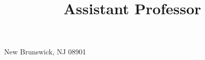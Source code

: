 



\usepackage{url,fancyhdr}

\usepackage{fontspec}
\usepackage{xunicode}
\usepackage{xcolor}

\let\sups\relax
\usepackage{tipa}
\usepackage{multicol}
\usepackage[spanish, english]{babel}
\usepackage{natbib}
\usepackage{bibentry}
\newcommand{\bibverse}[1]{\begin{verse} \bibentry{#1}. \end{verse}}
\usepackage{hanging}
\usepackage{fontawesome5}
\usepackage{academicons}

\usepackage[scale=0.8]{geometry}





\title{Assistant Professor}
\address{Rutgers University \\ 
         Department of Spanish and Portuguese}{New Brunswick, NJ 08901}
\def\mytitle{Assistant Professor}
\def\myphone{(848) 932-6930}
\def\myskype{casillas.joseph}
\def\myemail{joseph.casillas@rutgers.edu}
\def\myweb{www.jvcasillas.com}
\def\facweb{https://span-port.rutgers.edu/people/faculty/30-personnel/faculty/771-joseph-casillas}
\def\school{Rutgers University}
\def\schoolweb{http://www.arizona.edu}


